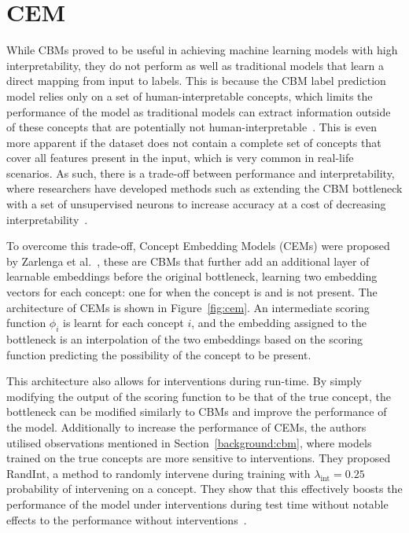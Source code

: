 \section{CEM}\label{background:cem}

While CBMs proved to be useful in achieving machine learning models with high
interpretability, they do not perform as well as traditional models that learn a direct
mapping from input to labels. This is because the CBM label
prediction model relies only on a set of human-interpretable concepts, which limits
the performance of the model as traditional models can extract
information outside of these concepts that are potentially not human-interpretable~\cite{cem}. 
This is even more apparent
if the dataset does not contain a complete set of concepts that cover all
features present in the input, which is very common in real-life scenarios.
As such, there is a trade-off between performance and interpretability, where researchers
have developed methods such as extending the CBM bottleneck with a set of unsupervised neurons
to increase accuracy at a cost of decreasing interpretability~\cite{cbm-hybrid}.

To overcome this trade-off, Concept Embedding Models (CEMs) were proposed by Zarlenga et al.~\cite{cem},
these are CBMs that further add an additional layer of learnable embeddings before
the original bottleneck, learning two embedding vectors for each concept: one for
when the concept is and is not present. The architecture of CEMs is shown in Figure~\ref{fig:cem}.
An intermediate scoring function $\phi_i$ is learnt for each concept $i$, 
and the embedding assigned to the bottleneck is an interpolation of the two embeddings
based on the scoring function predicting the possibility of the concept to be present.

This architecture also allows for interventions during run-time. By simply modifying the
output of the scoring function to be that of the true concept, the bottleneck 
can be modified similarly to CBMs and improve the performance of the model. Additionally
to increase the performance of CEMs, the authors utilised observations mentioned in
Section~\ref{background:cbm}, where models trained on the true concepts are more sensitive to 
interventions. They proposed RandInt, a method to randomly intervene
during training with $\lambda_{\text{int}} = 0.25$ probability of intervening
on a concept. They show that this effectively boosts the performance of the model 
under interventions during test time without notable effects to the performance 
without interventions~\cite{cem}.

